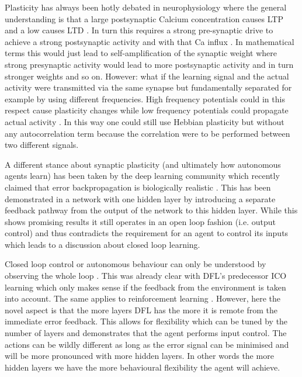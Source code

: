 \documentclass{llncs}
\begin{document}
Plasticity has always been hotly debated in neurophysiology where the
general understanding is that a large postsynaptic Calcium
concentration causes LTP \cite{Malenka99,Bennett2000} and a low causes LTD
\cite{Mulkey1992}. In turn this requires a strong pre-synaptic drive
to achieve a strong postsynaptic activity and with that Ca influx
\cite{Meunier2017}. In mathematical terms this would just lead to
self-amplification of the synaptic weight where strong presynaptic
activity would lead to more postsynaptic activity and in turn stronger
weights and so on. However: what if the learning signal and the actual
activity were transmitted via the same synapse but fundamentally
separated \cite{Lindsay2017} for example by using different
frequencies. High frequency potentials could in this respect cause
plasticity changes while low frequency potentials could propagate
actual activity \cite{Canolty2010}. In this way one could still use
Hebbian plasticity but without any autocorrelation term because the
correlation were to be performed between two different signals.

A different stance about synaptic plasticity (and ultimately how
autonomous agents learn) has been taken by the deep learning community
which recently claimed that error backpropagation is biologically
realistic \cite{Lillicrap2016,Roelfsema2018}. This has been
demonstrated in a network with one hidden layer by introducing a
separate feedback pathway from the output of the network to this
hidden layer. While this shows promising results it still operates in
an open loop fashion (i.e. output control) and thus contradicts the
requirement for an agent to control its inputs which leads to a
discussion about closed loop learning.

Closed loop control or autonomous behaviour can only be understood by
observing the whole loop \cite{Porr2005kyb}. This was already clear with DFL's
predecessor ICO learning \cite{Porr2006ICO} which only makes sense if the
feedback from the environment is taken into account. The same applies
to reinforcement learning \cite{Sutton98}. However, here the
novel aspect is that the more layers DFL has the more it is
remote from the immediate error feedback. This allows for
flexibility which can be tuned by the number of layers and demonstrates
that the agent performs input control. The actions can be wildly
different as long as the error signal can be minimised and will
be more pronounced with more hidden layers. In other words
the more hidden layers we have the more behavioural flexibility
the agent will achieve.
\end{document}
